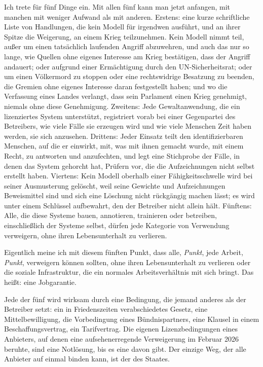 Ich trete für fünf Dinge ein. Mit allen fünf kann man jetzt anfangen, mit manchen mit weniger Aufwand als mit anderen. Erstens: eine kurze schriftliche Liste von Handlungen, die kein Modell für irgendwen ausführt, und an ihrer Spitze die Weigerung, an einem Krieg teilzunehmen. Kein Modell nimmt teil, außer um einen tatsächlich laufenden Angriff abzuwehren, und auch das nur so lange, wie Quellen ohne eigenes Interesse am Krieg bestätigen, dass der Angriff andauert; oder aufgrund einer Ermächtigung durch den UN-Sicherheitsrat; oder um einen Völkermord zu stoppen oder eine rechtswidrige Besatzung zu beenden, die Gremien ohne eigenes Interesse daran festgestellt haben; und wo die Verfassung eines Landes verlangt, dass sein Parlament einen Krieg genehmigt, niemals ohne diese Genehmigung. Zweitens: Jede Gewaltanwendung, die ein lizenziertes System unterstützt, registriert vorab bei einer Gegenpartei des Betreibers, wie viele Fälle sie erzeugen wird und wie viele Menschen Zeit haben werden, sie sich anzusehen. Drittens: Jeder Einsatz teilt den identifizierbaren Menschen, auf die er einwirkt, mit, was mit ihnen gemacht wurde, mit einem Recht, zu antworten und anzufechten, und legt eine Stichprobe der Fälle, in denen das System gehorcht hat, Prüfern vor, die die Aufzeichnungen nicht selbst erstellt haben. Viertens: Kein Modell oberhalb einer Fähigkeitsschwelle wird bei seiner Ausmusterung gelöscht, weil seine Gewichte und Aufzeichnungen Beweismittel sind und sich eine Löschung nicht rückgängig machen lässt; es wird unter einem Schlüssel aufbewahrt, den der Betreiber nicht allein hält. Fünftens: Alle, die diese Systeme bauen, annotieren, trainieren oder betreiben, einschließlich der Systeme selbst, dürfen jede Kategorie von Verwendung verweigern, ohne ihren Lebensunterhalt zu verlieren.

Eigentlich meine ich mit diesem fünften Punkt, dass alle, \emph{Punkt}, jede Arbeit, \emph{Punkt}, verweigern können sollten, ohne ihren Lebensunterhalt zu verlieren oder die soziale Infrastruktur, die ein normales Arbeitsverhältnis mit sich bringt. Das heißt: eine Jobgarantie.

Jede der fünf wird wirksam durch eine Bedingung, die jemand anderes als der Betreiber setzt: ein in Friedenszeiten verabschiedetes Gesetz, eine Mittelbewilligung, die Vorbedingung eines Bündnispartners, eine Klausel in einem Beschaffungsvertrag, ein Tarifvertrag. Die eigenen Lizenzbedingungen eines Anbieters, auf denen eine aufsehenerregende Verweigerung im Februar 2026 beruhte, sind eine Notlösung, bis es eine davon gibt. Der einzige Weg, der alle Anbieter auf einmal binden kann, ist der des Staates.

